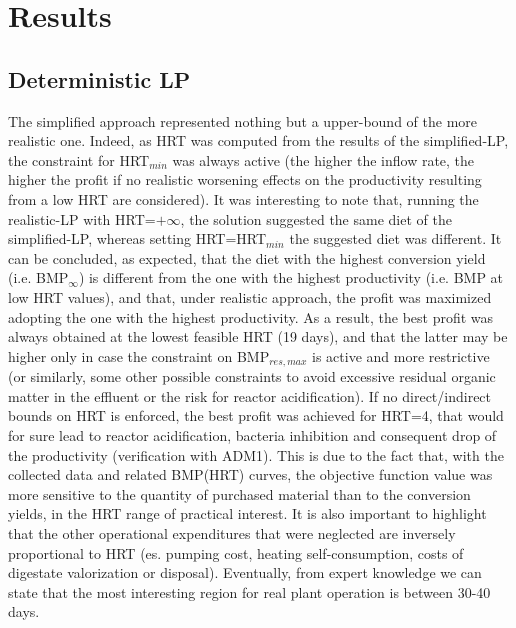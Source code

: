 \section{Results}

\subsection{Deterministic LP}
The simplified approach represented nothing but a upper-bound of the more realistic one. Indeed, as HRT was computed from the results of the simplified-LP, the constraint for HRT$_{min}$ was always active (the higher the inflow rate, the higher the profit if no realistic worsening effects on the productivity resulting from a low HRT are considered).
It was interesting to note that, running the realistic-LP with HRT=$+\infty$, the solution suggested the same diet of the simplified-LP, whereas setting HRT=HRT$_{min}$ the suggested diet was different.
It can be concluded, as expected, that the diet with the highest conversion yield (i.e. BMP$_\infty$) is different from the one with the highest productivity (i.e. BMP at low HRT values), and that, under realistic approach, the profit was maximized adopting the one with the highest productivity.
As a result, the best profit was always obtained at the lowest feasible HRT (19 days), and that the latter may be higher only in case the constraint on BMP$_{res,max}$ is active and more restrictive (or similarly, some other possible constraints to avoid excessive residual organic matter in the effluent or the risk for reactor acidification). If no direct/indirect bounds on HRT is enforced, the best profit was achieved for HRT=4, that would for sure lead to reactor acidification, bacteria inhibition and consequent drop of the productivity (verification with ADM1).
This is due to the fact that, with the collected data and related BMP(HRT) curves, the objective function value was more sensitive to the quantity of purchased material than to the conversion yields, in the HRT range of practical interest. 
It is also important to highlight that the other operational expenditures that were neglected are inversely proportional to HRT (es. pumping cost, heating self-consumption, costs of digestate valorization or disposal).
Eventually, from expert knowledge we can state that the most interesting region for real plant operation is between 30-40 days.

